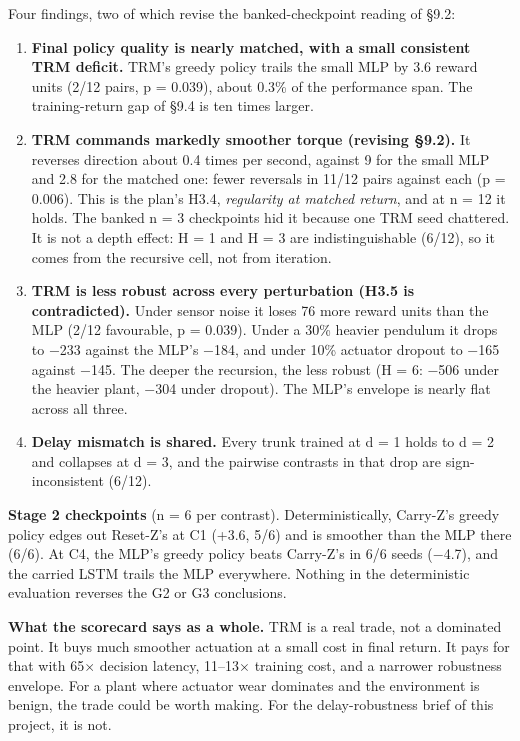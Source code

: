 \documentclass[11pt]{article}
\begin{document}
Four findings, two of which revise the banked-checkpoint reading of \S{}9.2:



\begin{enumerate}
\item \textbf{Final policy quality is nearly matched, with a small consistent TRM deficit.} TRM's greedy policy trails the small MLP by 3.6 reward units (2/12 pairs, p = 0.039), about 0.3\% of the performance span. The training-return gap of \S{}9.4 is ten times larger.
\item \textbf{TRM commands markedly smoother torque (revising \S{}9.2).} It reverses direction about 0.4 times per second, against 9 for the small MLP and 2.8 for the matched one: fewer reversals in 11/12 pairs against each (p = 0.006). This is the plan's H3.4, \emph{regularity at matched return}, and at n = 12 it holds. The banked n = 3 checkpoints hid it because one TRM seed chattered. It is not a depth effect: H = 1 and H = 3 are indistinguishable (6/12), so it comes from the recursive cell, not from iteration.
\item \textbf{TRM is less robust across every perturbation (H3.5 is contradicted).} Under sensor noise it loses 76 more reward units than the MLP (2/12 favourable, p = 0.039). Under a 30\% heavier pendulum it drops to $-$233 against the MLP's $-$184, and under 10\% actuator dropout to $-$165 against $-$145. The deeper the recursion, the less robust (H = 6: $-$506 under the heavier plant, $-$304 under dropout). The MLP's envelope is nearly flat across all three.
\item \textbf{Delay mismatch is shared.} Every trunk trained at d = 1 holds to d = 2 and collapses at d = 3, and the pairwise contrasts in that drop are sign-inconsistent (6/12).
\end{enumerate}



\textbf{Stage 2 checkpoints} (n = 6 per contrast). Deterministically, Carry-Z's greedy policy edges out Reset-Z's at C1 (+3.6, 5/6) and is smoother than the MLP there (6/6). At C4, the MLP's greedy policy beats Carry-Z's in 6/6 seeds ($-$4.7), and the carried LSTM trails the MLP everywhere. Nothing in the deterministic evaluation reverses the G2 or G3 conclusions.



\textbf{What the scorecard says as a whole.} TRM is a real trade, not a dominated point. It buys much smoother actuation at a small cost in final return. It pays for that with 65$\times$ decision latency, 11--13$\times$ training cost, and a narrower robustness envelope. For a plant where actuator wear dominates and the environment is benign, the trade could be worth making. For the delay-robustness brief of this project, it is not.
\end{document}

